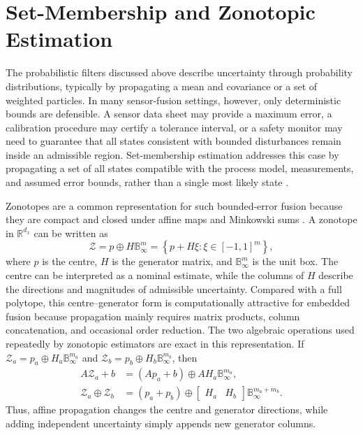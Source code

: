 \section{Set-Membership and Zonotopic Estimation}
\label{sec:set-membership}

The probabilistic filters discussed above describe uncertainty through probability distributions, typically by propagating a mean and covariance or a set of weighted particles. In many sensor-fusion settings, however, only deterministic bounds are defensible. A sensor data sheet may provide a maximum error, a calibration procedure may certify a tolerance interval, or a safety monitor may need to guarantee that all states consistent with bounded disturbances remain inside an admissible region. Set-membership estimation addresses this case by propagating a set of all states compatible with the process model, measurements, and assumed error bounds, rather than a single most likely state \cite{alamo2005_zonotopes,rego2020_constrained_zonotopes}.

Zonotopes are a common representation for such bounded-error fusion because they are compact and closed under affine maps and Minkowski sums \cite{girard2005_zonotopes}. A zonotope in $\mathbb{R}^{d_x}$ can be written as
\begin{equation}
\mathcal{Z}=p\oplus H\mathbb{B}_{\infty}^{m}
=\left\{p+H\xi:\xi\in[-1,1]^m\right\},
\end{equation}
where $p$ is the centre, $H$ is the generator matrix, and $\mathbb{B}_{\infty}^{m}$ is the unit box. The centre can be interpreted as a nominal estimate, while the columns of $H$ describe the directions and magnitudes of admissible uncertainty. Compared with a full polytope, this centre--generator form is computationally attractive for embedded fusion because propagation mainly requires matrix products, column concatenation, and occasional order reduction.
The two algebraic operations used repeatedly by zonotopic estimators are exact in this representation. If $\mathcal{Z}_a=p_a\oplus H_a\mathbb{B}_{\infty}^{m_a}$ and $\mathcal{Z}_b=p_b\oplus H_b\mathbb{B}_{\infty}^{m_b}$, then
\begin{align}
A\mathcal{Z}_a+b
&=(Ap_a+b)\oplus AH_a\mathbb{B}_{\infty}^{m_a},\\
\mathcal{Z}_a\oplus\mathcal{Z}_b
&=(p_a+p_b)\oplus
\begin{bmatrix}H_a&H_b\end{bmatrix}
\mathbb{B}_{\infty}^{m_a+m_b}.
\end{align}
Thus, affine propagation changes the centre and generator directions, while adding independent uncertainty simply appends new generator columns.

